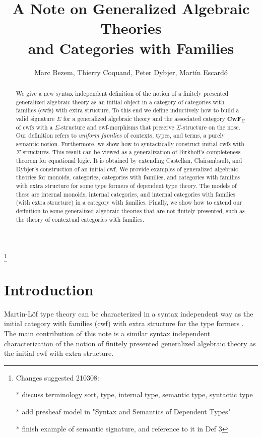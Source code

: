 \documentclass{lmcs}
\title[Generalized Algebraic Theories and Categories with Families]{A Note on Generalized Algebraic Theories\\and Categories with Families}\author{Marc Bezem, Thierry Coquand, Peter Dybjer, Mart\'in Escard\'o}
\def\Cwf{\mathbf{CwF}}
\begin{document}
\maketitle

\begin{abstract}
We give a new syntax independent definition of the notion of a finitely presented generalized algebraic theory as an initial object in a category of categories with families (cwfs) with extra structure. To this end we define inductively how to build a valid signature $\Sigma$ for a generalized algebraic theory and the associated category $\Cwf_\Sigma$ of cwfs with a $\Sigma$-structure and cwf-morphisms that preserve $\Sigma$-structure on the nose.  Our definition refers to {\em uniform families} of contexts, types, and terms, a purely semantic notion. Furthermore, we show how to syntactically construct initial cwfs with $\Sigma$-structures. This result can be viewed as a generalization of Birkhoff's completeness theorem for equational logic. It is obtained by extending Castellan, Clairambault, and Dybjer's construction of an initial cwf. We provide examples of generalized algebraic theories for monoids, categories, categories with families, and categories with families with extra structure for some type formers of dependent type theory. The models of these are internal monoids, internal categories, and internal categories with families (with extra structure) in a category with families. Finally, we show how to extend our definition to some generalized algebraic theories that are not finitely presented, such as the theory of contextual categories with families.
\end{abstract}
\footnote{Changes suggested 210308: 

* discuss terminology sort, type, internal type, semantic type, syntactic type

* add presheaf model in "Syntax and Semantics of Dependent Types"

* finish example of semantic signature, and reference to it in Def 3
}

\section{Introduction}

Martin-Löf type theory can be characterized in a syntax independent way as the initial category with families (cwf)  with extra structure for the type formers \cite{castellan:tlca2015,castellan:lmcs}. The main contribution of this note is a similar syntax independent characterization of the notion of finitely presented generalized algebraic theory as the initial cwf with extra structure.
\end{document}
